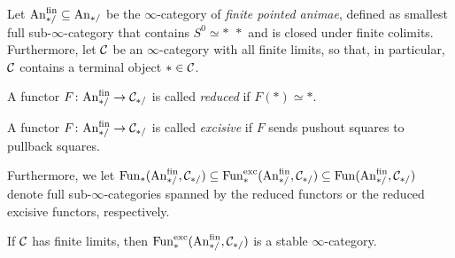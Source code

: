 \begin{defi}\label{def:Excisive}
	Let $\FinAn\subseteq \cat{An}_{*/}$ be the $\infty$-category of \emph{finite pointed animae}, defined as smallest full sub-$\infty$-category that contains ${S^0}\simeq *\ \,*$ and is closed under finite colimits. Furthermore, let $\mathcal{C}$ be an $\infty$-category with all finite limits, so that, in particular, $\mathcal{C}$ contains a terminal object $*\in\mathcal{C}$.
	\begin{alphanumerate}
		\item A functor $F\colon \FinAn\rightarrow \Cc_{*/}$ is called \emph{reduced} if $F(*)\simeq *$.\label{enum:Reduced}
		\item A functor $F\colon \FinAn\rightarrow \Cc_{*/}$ is called \emph{excisive} if $F$ sends pushout squares to pullback squares.\label{enum:Excisibe}
	\end{alphanumerate}
	Furthermore, we let $\Fun_*(\FinAn,\Cc_{*/})\subseteq \Fun_*^\mathrm{exc}(\FinAn,\Cc_{*/})\subseteq\Fun(\FinAn,\Cc_{*/})$ denote full sub-$\infty$-categories spanned by the reduced functors or the reduced excisive functors, respectively.
\end{defi}
\begin{lem}\label{lem:FunExcStable}
	If $\mathcal{C}$ has finite limits, then $\Fun_*^\mathrm{exc}(\FinAn,\Cc_{*/})$ is a stable $\infty$-category.
\end{lem}

